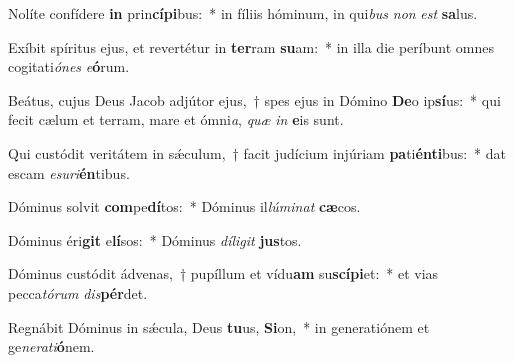 \item Nolíte confídere \textbf{in} prin\textbf{cí}\textbf{pi}bus:~* in fíliis hóminum, in qui\textit{bus} \textit{non} \textit{est} \textbf{sa}lus.
\item Exíbit spíritus ejus, et revertétur in \textbf{ter}ram \textbf{su}am:~* in illa die períbunt omnes cogitati\textit{ó}\textit{nes} \textit{e}\textbf{ó}rum.
\item Beátus, cujus Deus Jacob adjútor ejus,~† spes ejus in Dómino \textbf{De}o ip\textbf{sí}us:~* qui fecit cælum et terram, mare et ómni\textit{a}, \textit{quæ} \textit{in} \textbf{e}is sunt.
\item Qui custódit veritátem in sǽculum,~† facit judícium injúriam \textbf{pa}ti\textbf{én}\textbf{ti}bus:~* dat escam \textit{e}\textit{su}\textit{ri}\textbf{én}tibus.
\item Dóminus solvit \textbf{com}pe\textbf{dí}tos:~* Dóminus il\textit{lú}\textit{mi}\textit{nat} \textbf{cæ}cos.
\item Dóminus éri\textbf{git} e\textbf{lí}sos:~* Dóminus \textit{dí}\textit{li}\textit{git} \textbf{jus}tos.
\item Dóminus custódit ádvenas,~† pupíllum et vídu\textbf{am} su\textbf{scí}\textbf{pi}et:~* et vias pecca\textit{tó}\textit{rum} \textit{dis}\textbf{pér}det.
\item Regnábit Dóminus in sǽcula, Deus \textbf{tu}us, \textbf{Si}on,~* in generatiónem et ge\textit{ne}\textit{ra}\textit{ti}\textbf{ó}nem.
